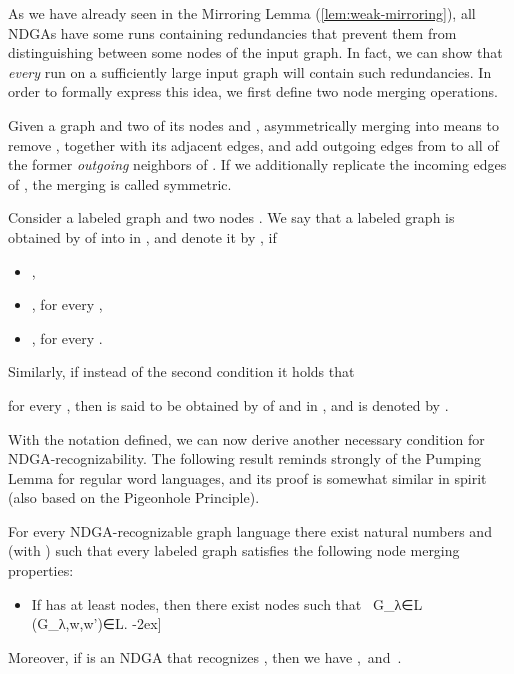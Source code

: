\documentclass[a4paper,11pt,twoside]{report} \pdfoutput=1
\begin{document}
As we have already seen in the Mirroring Lemma
(\cref{lem:weak-mirroring}), all NDGAs have some runs containing
redundancies that prevent them from distinguishing between some nodes
of the input graph. In fact, we can show that \emph{every} run on a
sufficiently large input graph will contain such redundancies. In
order to formally express this idea, we first define two node merging
operations.

Given a graph and two of its nodes  and , asymmetrically
merging  into  means to remove , together with its adjacent
edges, and add outgoing edges from  to all of the former
\emph{outgoing} neighbors of . If we additionally replicate the
incoming edges of , the merging is called symmetric.

\begin{definition}
  Consider a labeled graph  and two nodes
  . We say that a labeled graph  is obtained by
   of  into  in , and denote it
  by , if
  \begin{itemize}[topsep=1ex,itemsep=0ex]
  \item ,
  \item , \quad for every ,
  \item , \quad for every .
  \end{itemize}
  Similarly, if instead of the second condition it holds that
  
  for every , then  is said to be obtained by
   of  and  in , and is denoted by
  .
\end{definition}

With the notation defined, we can now derive another necessary
condition for NDGA-recognizability. The following result reminds
strongly of the Pumping Lemma for regular word languages, and its
proof is somewhat similar in spirit (also based on the Pigeonhole
Principle).

\begin{lemma} \label{lem:merging}
  For every NDGA-recognizable graph language  there exist natural
  numbers  and  (with ) such that every labeled graph 
  satisfies the following node merging properties:
  \begin{itemize}
  \item If  has at least  nodes, then there exist nodes
     such that \
      G_λ∈L \quad {} \quad \amrg(G_λ,w,w')∈L.
    -2ex]
    
  \end{itemize}
  Moreover, if  is an NDGA that recognizes
  , then we have ,\, and\, .
\end{lemma}
\end{document}
